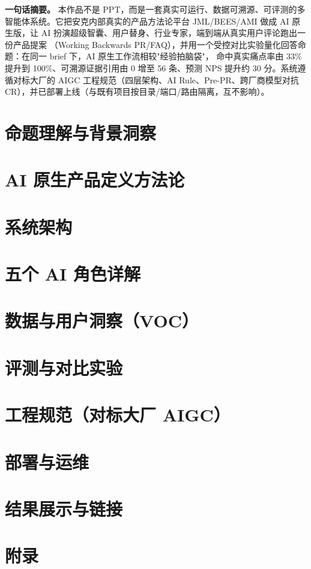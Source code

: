 \documentclass[11pt,a4paper,fontset=fandol]{ctexart}
\begin{document}
\vspace{0.8cm}
\noindent\textbf{\color{primary}一句话摘要。}\;
本作品不是 PPT，而是一套真实可运行、数据可溯源、可评测的多智能体系统。它把安克内部真实的产品方法论平台
JML/BEES/AMI 做成 AI 原生版，让 AI 扮演超级智囊、用户替身、行业专家，端到端从真实用户评论跑出一份产品提案
（Working Backwards PR/FAQ），并用一个受控对比实验量化回答命题：在同一 brief 下，AI 原生工作流相较"经验拍脑袋"，
命中真实痛点率由 33\% 提升到 100\%、可溯源证据引用由 0 增至 56 条、预测 NPS 提升约 30 分。系统遵循对标大厂的
AIGC 工程规范（四层架构、AI Rule、Pre-PR、跨厂商模型对抗 CR），并已部署上线（与既有项目按目录/端口/路由隔离，互不影响）。

\newpage
\tableofcontents
\newpage

\part{命题理解与背景洞察}


\part{AI 原生产品定义方法论}


\part{系统架构}


\part{五个 AI 角色详解}


\part{数据与用户洞察（VOC）}


\part{评测与对比实验}


\part{工程规范（对标大厂 AIGC）}


\part{部署与运维}


\part{结果展示与链接}


\appendix
\part{附录}


\end{document}

